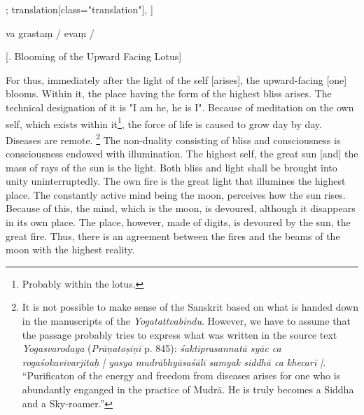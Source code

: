 \begin{alignment}[
  texts=edition[class="edition"];
  translation[class="translation"],
  ]
\begin{edition}
\begin{prose}
va
grastaṃ
/
evaṃ 
/
\end{prose}
\end{edition}
\begin{translation}
    \centerline{\textrm{\small{[. Blooming of the Upward Facing Lotus]}}}
    \bigskip
    \begin{tlate}
      \noindent
      For thus, immediately after the light of the self [arises], the upward-facing [one] blooms. Within it, the place having the form of the highest bliss arises. The technical designation of it is "I am he, he is I". Because of meditation on the own self, which exists within it\footnote{Probably within the lotus.}, the force of life is caused to grow day by day. Diseases are remote. \crazy{\textbf{\Large{\sic{\ldots}}}}\footnote{It is not possible to make sense of the Sanskrit based on what is handed down in the manuscripts of the \textit{Yogatattvabindu}. However, we have to assume that the passage probably tries to express what was written in the source text \textit{Yogasvarodaya} (\textit{Prāṇatoṣiṇī} p. 845): \textit{śaktiprasannatā syāc ca rogaśokavivarjitaḥ | yasya mudrābhyāsaśālī samyak siddhā ca  khecarī |}. ``Purificaton of the energy and freedom from diseases arises for one who is abundantly enganged in the practice of Mudrā. He is truly becomes a Siddha and a Sky-roamer.''} The non-duality consisting of bliss and consciousness is consciousness endowed with illumination. The highest self, the great sun [and] the mass of rays of the sun is the light. Both bliss and light shall be brought into unity uninterruptedly. The own fire is the great light that illumines the highest place. The constantly active mind being the moon, perceives how the sun rises. Because of this, the mind, which is the moon, is devoured, although it disappears in its own place. The place, however, made of digits, is devoured by the sun, the great fire. Thus, there is an agreement between the fires and the beams of the moon with the highest reality.
\end{tlate}
  \end{translation}
\end{alignment}
